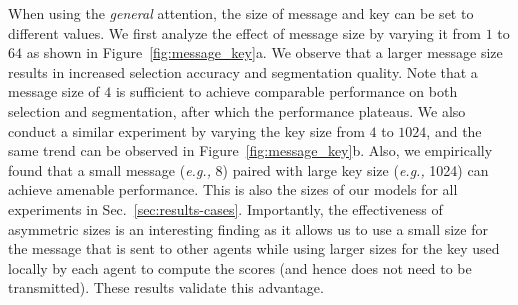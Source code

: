 When using the \textit{general} attention, the size of message and key can be set to different values. We first analyze the effect of message size by varying it from $1$ to $64$ as shown in Figure~\ref{fig:message_key}a.
We observe that a larger message size results in increased selection accuracy and segmentation quality. 
Note that a message size of $4$ is sufficient to achieve comparable performance on both selection and segmentation, after which the performance plateaus. 
We also conduct a similar experiment by varying the key size from $4$ to $1024$, and the same trend can be observed in Figure~\ref{fig:message_key}b. 
Also, we empirically found that a small message (\textit{e.g.,} 8) paired with large key size (\textit{e.g.,} 1024) can achieve amenable performance. 
This is also the sizes of our models for all experiments in Sec.~\ref{sec:results-cases}. 
Importantly, the effectiveness of asymmetric sizes is an interesting finding as it allows us to use a small size for the message that is sent to other agents while using larger sizes for the key used locally by each agent to compute the scores (and hence does not need to be transmitted). These results validate this advantage. 
